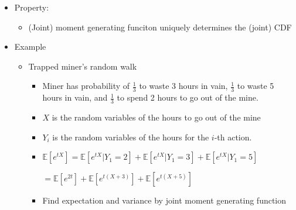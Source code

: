 \documentclass[a4paper]{article}
\begin{document}
\begin{itemize}
    \item Property:
        \begin{itemize}
            \item (Joint) moment generating funciton uniquely determines the (joint) CDF
        \end{itemize}
    \item Example
        \begin{itemize}
            \item Trapped miner's random walk
                \begin{itemize}
                    \item Miner has probability of $\frac{1}{3}$ to waste 3 hours in vain, $\frac{1}{3}$ to waste 5 hours in vain, and $\frac{1}{3}$ to spend 2 hours to go out of the mine.
                    \item $X$ is the random variables of the hours to go out of the mine
                    \item $Y_i$ is the random variables of the hours for the $i$-th action.
                    \item $\mathbb{E}[e^{tX}] = \mathbb{E}[e^{tX}|Y_1 = 2] + \mathbb{E}[e^{tX}|Y_1 = 3] + \mathbb{E}[e^{tX}|Y_1 = 5]$

                        $= \mathbb{E}[e^{2t}] + \mathbb{E}[e^{t(X+3)}] + \mathbb{E}[e^{t(X+5)}]$
                    \item Find expectation and variance by joint moment generating function
                \end{itemize}
        \end{itemize}
\end{itemize}
\end{document}
